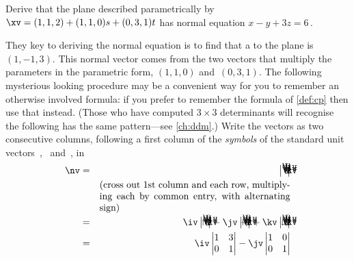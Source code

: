 \begin{example} \label{eg:nviax}
Derive that the plane described parametrically by \(\xv=(1,1,2)+(1,1,0)s+(0,3,1)t\) has normal equation \(x-y+3z=6\)\,.
\begin{solution} 
They key to deriving the normal equation is to find that a  to the plane is~\((1,-1,3)\).
This normal vector comes from the two vectors that multiply the parameters in the parametric form, \((1,1,0)\) and~\((0,3,1)\).
The following mysterious looking procedure may be a convenient way for you to remember an otherwise involved formula: if you prefer to remember the formula of \autoref{def:cp} then use that instead.
(Those who have computed \(3\times3\) determinants will recognise the following has the same pattern---see \autoref{ch:ddm}.)
Write the vectors as two consecutive columns, following a first column of the \emph{symbols} of the standard unit vectors~\iv, \jv\ and~\kv, in
\setlength{\unitlength}{1.2ex}
\def\abc#1{\begin{vmatrix}\begin{picture}(5.3,6)
\put(0,4){$\iv$}\put(2,4){$1$}\put(4,4){$0$}
\put(0,2){$\jv$}\put(2,2){$1$}\put(4,2){$3$}
\put(0,0){$\kv$}\put(2,0){$0$}\put(4,0){$1$}
\ifnum1=#1\put(0.5,-0.5){\line(0,1)6}\put(-0.5,4.5){\line(1,0)6}\fi
\ifnum2=#1\put(0.5,-0.5){\line(0,1)6}\put(-0.5,2.5){\line(1,0)6}\fi
\ifnum3=#1\put(0.5,-0.5){\line(0,1)6}\put(-0.5,0.5){\line(1,0)6}\fi
\end{picture}\end{vmatrix}}
\def\ab#1#2#3#4{\begin{vmatrix}\begin{picture}(3,4)
\put(0,2){$#1$}\put(2,2){$#2$}
\put(0,0){$#3$}\put(2,0){$#4$}
\color{red}\put(-0.5,-0.5){\line(1,1)4}
\color{blue}\put(-0.5,3.5){\line(1,-1)4}
\end{picture}\end{vmatrix}}
\begin{eqnarray*}
\nv&=& \abc0 
\\&&\parbox{20em}{(cross out 1st column and each row, multiplying each by common entry, with alternating sign)}
\\&=&\iv\abc1-\jv\abc2+\kv\abc3
\\&=&\iv\begin{vmatrix} 1&3\\0&1 \end{vmatrix}
-\jv\begin{vmatrix} 1&0\\0&1 \end{vmatrix}

\end{eqnarray*}
\end{solution}
\end{example}
